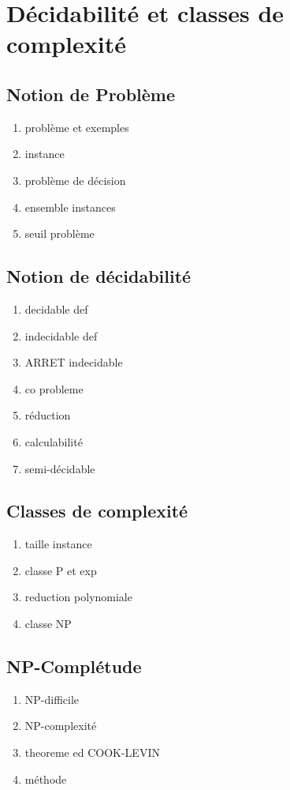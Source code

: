\section{Décidabilité et classes de complexité}

\subsection{Notion de Problème}

\begin{enumerate}
    \item problème et exemples
    \item instance
    \item problème de décision
    \item ensemble instances
    \item seuil problème
\end{enumerate}

\subsection{Notion de décidabilité}

\begin{enumerate}
    \item decidable def
    \item indecidable def
    \item ARRET indecidable
    \item co probleme
    \item réduction
    \item calculabilité
    \item semi-décidable
\end{enumerate}

\subsection{Classes de complexité}

\begin{enumerate}
    \item taille instance
    \item classe P et exp
    \item reduction polynomiale
    \item classe NP
\end{enumerate}

\subsection{NP-Complétude}

\begin{enumerate}
    \item NP-difficile
    \item NP-complexité
    \item theoreme ed COOK-LEVIN
    \item méthode
\end{enumerate}